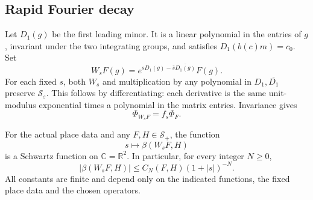 \subsection{Rapid Fourier decay}

Let \(D_1(g)\) be the first leading minor.  It is a linear
polynomial in the entries of \(g\), invariant under the two
integrating groups, and satisfies \(D_1(b(c)m)=c_0\).
Set
\[
       W_sF(g)=e^{sD_1(g)-\bar s\overline{D_1(g)}}F(g).
\]
For each fixed \(s\), both \(W_s\) and multiplication
by any polynomial in \(D_1,\overline{D_1}\) preserve
\(\mathscr S_\varepsilon\).  This follows by differentiating:
each derivative is the same unit-modulus exponential times
a polynomial in the matrix entries.  Invariance gives
\begin{equation}\label{jf-wave}
                        \Phi_{W_sF}=f_s\Phi_F.
\end{equation}

\begin{theorem}\label{jf-fourier-decay}
For the actual place data and any \(F,H\in\mathscr S_+\),
the function
\[
                       s\longmapsto\beta(W_sF,H)
\]
is a Schwartz function on \(\mathbb C=\mathbb R^2\).
In particular, for every integer \(N\geq0\),
\begin{equation}\label{jf-decay-bound}
        |\beta(W_sF,H)|\leq C_N(F,H)(1+|s|)^{-N}.
\end{equation}
All constants are finite and depend only on the indicated
functions, the fixed place data and the chosen operators.
\end{theorem}

